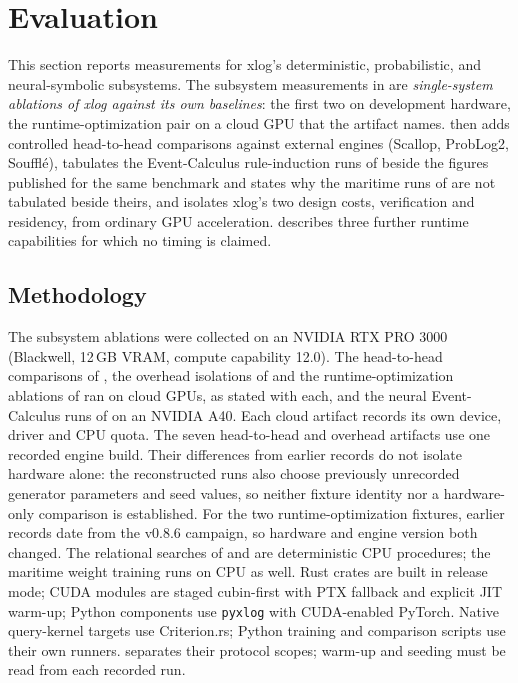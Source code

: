 \section{Evaluation}\label{sec:eval}

This section reports measurements for xlog's deterministic, probabilistic, and neural-symbolic subsystems. The subsystem measurements in  are \emph{single-system ablations of xlog against its own baselines}: the first two on development hardware, the runtime-optimization pair on a cloud GPU that the artifact names.  then adds controlled head-to-head comparisons against external engines (Scallop, ProbLog2, Soufflé),  tabulates the Event-Calculus rule-induction runs of  beside the figures published for the same benchmark and states why the maritime runs of  are not tabulated beside theirs, and  isolates xlog's two design costs, verification and residency, from ordinary GPU acceleration.  describes three further runtime capabilities for which no timing is claimed.

\subsection{Methodology}

The subsystem ablations were collected on an NVIDIA RTX PRO 3000 (Blackwell, 12\,GB VRAM, compute capability 12.0). The head-to-head comparisons of , the overhead isolations of  and the runtime-optimization ablations of  ran on cloud GPUs, as stated with each, and the neural Event-Calculus runs of  on an NVIDIA A40. Each cloud artifact records its own device, driver and CPU quota. The seven head-to-head and overhead artifacts use one recorded engine build. Their differences from earlier records do not isolate hardware alone: the reconstructed runs also choose previously unrecorded generator parameters and seed values, so neither fixture identity nor a hardware-only comparison is established. For the two runtime-optimization fixtures, earlier records date from the v0.8.6 campaign, so hardware and engine version both changed. The relational searches of  and  are deterministic CPU procedures; the maritime weight training runs on CPU as well. Rust crates are built in release mode; CUDA modules are staged cubin-first with PTX fallback and explicit JIT warm-up; Python components use \texttt{pyxlog} with CUDA-enabled PyTorch. Native query-kernel targets use Criterion.rs; Python training and comparison scripts use their own runners.  separates their protocol scopes; warm-up and seeding must be read from each recorded run.

